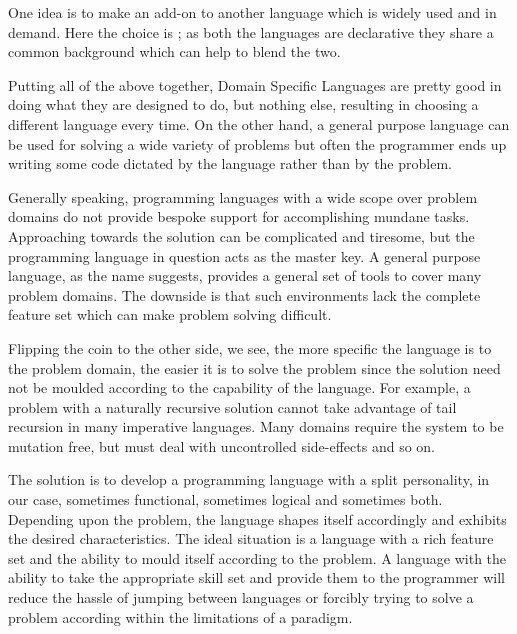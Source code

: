 \documentclass[thesis-solanki.tex]{subfiles}
\begin{document}
One idea is to make  an add-on to another language which is widely used and in demand.
Here the choice is ; as both the languages are declarative they share a common background which can
help to blend the two.

Putting all of the above together, Domain Specific Languages
are pretty good in doing what they are designed to do, but nothing else, resulting in choosing a different language
every time.
On the other hand, a general purpose language can be used for solving a wide variety of problems but often the
programmer ends up writing some code dictated by the language rather than by the problem.

Generally speaking, programming languages with a wide scope over problem domains do not provide bespoke support for
accomplishing  mundane tasks.
Approaching towards the solution can be complicated and tiresome, but the programming language in question acts as the
master key.
A general purpose language, as the name suggests,
provides a general set of tools to cover many
problem domains.
The downside is that such environments
lack the complete feature set which can make problem solving difficult.

Flipping the coin to the other side, we see, the more specific the language is to the problem domain, the easier it
is to solve the problem since the solution need not be moulded according to the capability  of the
language.
For example, a problem with a naturally recursive solution cannot take advantage of tail recursion in many
imperative languages.
Many domains require the system to be mutation free, but must deal with uncontrolled side-effects and so
on.


The solution is to develop a programming language with a split personality, in our case, sometimes functional,
sometimes logical and sometimes both.
Depending upon the problem, the language shapes itself accordingly and exhibits the desired characteristics.
The ideal situation is a language with a rich feature set and the ability to mould itself according to the problem.
A language with the ability to take the appropriate skill set and provide them to the programmer will reduce
the hassle of jumping between languages or forcibly trying to solve a problem according within the limitations of a paradigm.
\end{document}
